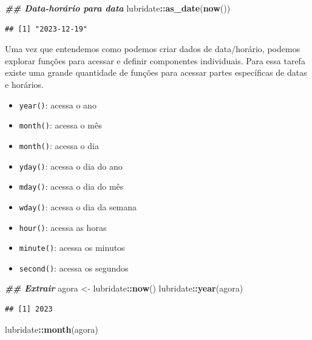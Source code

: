 \documentclass[
]{article}
\newenvironment{Shaded}{\begin{snugshade}}{\end{snugshade}}
\newcommand{\DocumentationTok}[1]{\textcolor[rgb]{0.56,0.35,0.01}{\textbf{\textit{#1}}}}
\newcommand{\FunctionTok}[1]{\textcolor[rgb]{0.13,0.29,0.53}{\textbf{#1}}}
\newcommand{\NormalTok}[1]{#1}
\newcommand{\OtherTok}[1]{\textcolor[rgb]{0.56,0.35,0.01}{#1}}
\newcommand{\SpecialCharTok}[1]{\textcolor[rgb]{0.81,0.36,0.00}{\textbf{#1}}}
\providecommand{\tightlist}{%
  \setlength{\itemsep}{0pt}\setlength{\parskip}{0pt}}
\begin{document}
\begin{Shaded}
\begin{Highlighting}[]
\DocumentationTok{\#\# Data{-}horário para data}
\NormalTok{lubridate}\SpecialCharTok{::}\FunctionTok{as\_date}\NormalTok{(}\FunctionTok{now}\NormalTok{())}
\end{Highlighting}
\end{Shaded}

\begin{verbatim}
## [1] "2023-12-19"
\end{verbatim}

Uma vez que entendemos como podemos criar dados de data/horário, podemos explorar funções para acessar e definir componentes individuais. Para essa tarefa existe uma grande quantidade de funções para acessar partes específicas de datas e horários.

\begin{itemize}
\tightlist
\item
  \texttt{year()}: acessa o ano
\item
  \texttt{month()}: acessa o mês
\item
  \texttt{month()}: acessa o dia
\item
  \texttt{yday()}: acessa o dia do ano
\item
  \texttt{mday()}: acessa o dia do mês
\item
  \texttt{wday()}: acessa o dia da semana
\item
  \texttt{hour()}: acessa as horas
\item
  \texttt{minute()}: acessa os minutos
\item
  \texttt{second()}: acessa os segundos
\end{itemize}

\begin{Shaded}
\begin{Highlighting}[]
\DocumentationTok{\#\# Extrair}
\NormalTok{agora }\OtherTok{\textless{}{-}}\NormalTok{ lubridate}\SpecialCharTok{::}\FunctionTok{now}\NormalTok{()}
\NormalTok{lubridate}\SpecialCharTok{::}\FunctionTok{year}\NormalTok{(agora)}
\end{Highlighting}
\end{Shaded}

\begin{verbatim}
## [1] 2023
\end{verbatim}

\begin{Shaded}
\begin{Highlighting}[]
\NormalTok{lubridate}\SpecialCharTok{::}\FunctionTok{month}\NormalTok{(agora)}
\end{Highlighting}
\end{Shaded}
\end{document}
